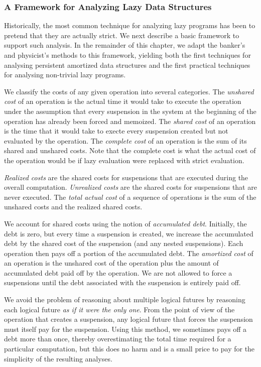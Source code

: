 \documentclass[12pt, a4paper]{article} %
\begin{document}
\subsubsection{A Framework for Analyzing Lazy Data Structures}%
\label{ssub:A Framework for Analyzing Lazy Data Structures}

Historically, the most common technique for analyzing lazy programs has been to pretend that they are actually strict. We next describe a basic framework to support such analysis. In the remainder of this chapter, we adapt the banker's and physicist's methods to this framework, yielding both the first techniques for analysing persistent amortized data structures and the first practical techniques for analysing non-trivial lazy programs.


We classify the costs of any given operation into several categories. The \textit{unshared cost} of an operation is the actual time it would take to execute the operation under the assumption that every suspension in the system at the beginning of the operation has already been forced and memoized. The \textit{shared cost} of an operation is the time that it would take to execte every suspension created but not evaluated by the operation. The \textit{complete cost} of an operation is the sum of its shared and unshared costs. Note that the complete cost is what the actual cost of the operation would be if lazy evaluation were replaced with strict evaluation.

\textit{Realized costs} are the shared costs for suspensions that are executed during the overall computation.
\textit{Unrealized costs} are the shared costs for suspensions that are never executed.
The \textit{total actual cost} of a sequence of operations is the sum of the unshared costs and the realized shared costs.

We account for shared costs using the notion of \textit{accumulated debt}. Initially, the debt is zero, but every time a suspension is created, we increase the accumulated debt by the shared cost of the suspension (and any nested suspensions). Each operation then pays off a portion of the accumulated debt. The \textit{amortized cost} of an operation is the unshared cost of the operation plus the amount of accumulated debt paid off by the operation. We are not allowed to force a suspensions until the debt associated with the suspension is entirely paid off.

We avoid the problem of reasoning about multiple logical futures by reasoning each logical future \textit{as if it were the only one}. From the point of view of the operation that creates a suspension, any logical future that forces the suspension must itself pay for the suspension. Using this method, we sometimes pays off a debt more than once, thereby overestimating the total time required for a particular computation, but this does no harm and is a small price to pay for the simplicity of the resulting analyses.
\end{document}
